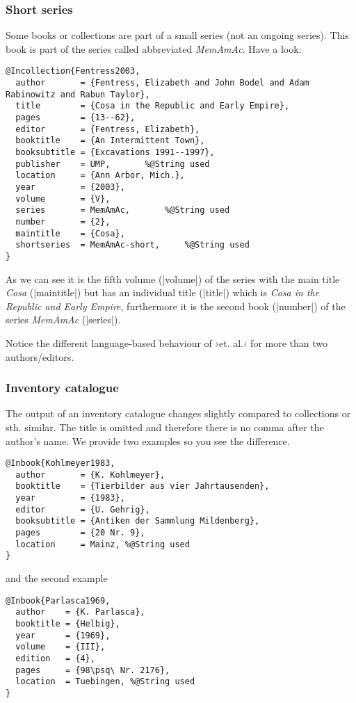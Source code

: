 \documentclass[a4paper,
10pt,
greek,
french,
spanish,
italian,
ngerman,
english
]{ltxdoc}
\begin{document}
\subsubsection{Short series}
Some books or collections are part of a small series (not an ongoing series).
This book is part of the series called abbreviated \emph{MemAmAc}.
Have a look:
\begin{lstlisting}[style=bibentry,label=Fentress2003,caption={{@}Incollection\{Fentress2003,…\} }]
@Incollection{Fentress2003,
  author       = {Fentress, Elizabeth and John Bodel and Adam Rabinowitz and Rabun Taylor},
  title        = {Cosa in the Republic and Early Empire},
  pages        = {13--62},
  editor       = {Fentress, Elizabeth},
  booktitle    = {An Intermittent Town},
  booksubtitle = {Excavations 1991--1997},
  publisher    = UMP,		%@String used
  location     = {Ann Arbor, Mich.},
  year         = {2003},
  volume       = {V},
  series       = MemAmAc,		%@String used
  number       = {2},
  maintitle    = {Cosa},
  shortseries  = MemAmAc-short,		%@String used
}
\end{lstlisting}
As we can see it is the fifth volume (|volume|) of the series with the main title 
\emph{Cosa} (|maintitle|) but has an individual title (|title|) which is
\emph{Cosa in the Republic and Early Empire}, furthermore it is the second book (|number|) 
of the series  \emph{MemAmAc} (|series|).

Notice the different language-based behaviour of ›et. al.‹ for more than two authors/editors.

 
\subsubsection{Inventory catalogue}
The output of an inventory catalogue changes slightly compared to collections or sth. similar. 
The title is omitted and therefore there is no comma after the author’s name.
We provide two examples so you see the difference.
\begin{lstlisting}[style=bibentry,label=Kohlmeyer1983,caption={{@}Inbook\{Kohlmeyer1983,…\} }]
@Inbook{Kohlmeyer1983,
  author       = {K. Kohlmeyer},
  booktitle    = {Tierbilder aus vier Jahrtausenden},
  year         = {1983},
  editor       = {U. Gehrig},
  booksubtitle = {Antiken der Sammlung Mildenberg},
  pages        = {20 Nr. 9},
  location     = Mainz, %@String used
}
\end{lstlisting}
and the second example

\begin{lstlisting}[style=bibentry,label=Parlasca1969,caption={{@}Inbook\{Parlasca1969,…\} }]
@Inbook{Parlasca1969,
  author    = {K. Parlasca},
  booktitle = {Helbig},
  year      = {1969},
  volume    = {III},
  edition   = {4},
  pages     = {98\psq\ Nr. 2176},
  location  = Tuebingen, %@String used
}
\end{lstlisting}
\end{document}
